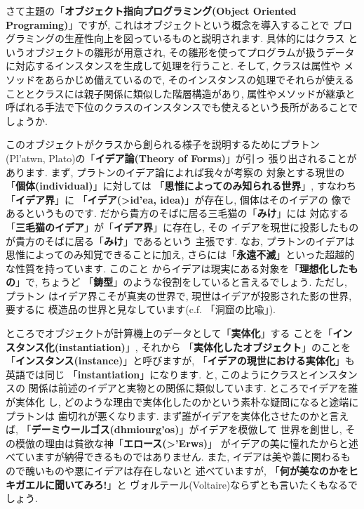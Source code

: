 \documentclass[b5j,8pt,twocolumn]{ltjsarticle}
\newcommand{\textgreek}[1]{\begingroup\fontencoding{LGR}\selectfont#1\endgroup}
\newcommand{\textgreek}[1]{\begingroup\fontencoding{LGR}\selectfont#1\endgroup}
\begin{document}
さて主題の「\textbf{オブジェクト指向プログラミング(Object Oriented
 Programing)}」ですが, これはオブジェクトという概念を導入することで
プログラミングの生産性向上を図っているものと説明されます. 具体的にはクラス
というオブジェクトの雛形が用意され, その雛形を使ってプログラムが扱うデータ
に対応するインスタンスを生成して処理を行うこと. そして, クラスは属性や
メソッドをあらかじめ備えているので, そのインスタンスの処理でそれらが使える
こととクラスには親子関係に類似した階層構造があり, 属性やメソッドが継承と
呼ばれる手法で下位のクラスのインスタンスでも使えるという長所があることで
しょうか.
\newline


このオブジェクトがクラスから創られる様子を説明するためにプラトン
(\textgreek{Pl'atwn}, Plato)の「\textbf{イデア論(Theory of Forms)}」が引っ
張り出されることがあります. まず, プラトンのイデア論によれば我々が考察の
対象とする現世の「\textbf{個体(individual)}」に対しては
「\textbf{思惟によってのみ知られる世界}」, すなわち「\textbf{イデア界}」に
「\textbf{イデア(\textgreek{>id'ea}, idea)}」が存在し, 個体はそのイデアの
像であるというものです. だから貴方のそばに居る三毛猫の「\textbf{みけ}」には
対応する「\textbf{三毛猫のイデア}」が「\textbf{イデア界}」に存在し, その
イデアを現世に投影したものが貴方のそばに居る「\textbf{みけ}」であるという
主張です. なお, プラトンのイデアは思惟によってのみ知覚できることに加え,
 さらには「\textbf{永遠不滅}」といった超越的な性質を持っています. このこと
からイデアは現実にある対象を「\textbf{理想化したもの}」で, ちょうど
「\textbf{鋳型}」のような役割をしていると言えるでしょう. ただし, プラトン
はイデア界こそが真実の世界で, 現世はイデアが投影された影の世界, 要するに
模造品の世界と見なしています(c.f. 「洞窟の比喩」\cite{国家}).
\newline


ところでオブジェクトが計算機上のデータとして「\textbf{実体化}」する
ことを「\textbf{インスタンス化(instantiation)}」, それから
「\textbf{実体化したオブジェクト}」のことを
「\textbf{インスタンス(instance)}」と呼びますが, 
「\textbf{イデアの現世における実体化}」も英語では同じ
「\textbf{instantiation}」になります. と, このようにクラスとインスタンスの
関係は前述のイデアと実物との関係に類似しています. ところでイデアを誰が実体化
し, どのような理由で実体化したのかという素朴な疑問になると途端にプラトンは
歯切れが悪くなります. まず誰がイデアを実体化させたのかと言えば,
 「\textbf{デーミウールゴス(\textgreek{dhmiourg'os})}」がイデアを模倣して
世界を創世し, その模倣の理由は貧欲な神「\textbf{エロース(\textgreek{>'Erws})}」
がイデアの美に憧れたからと述べていますが納得できるものではありません.
 また, イデアは美や善に関わるもので醜いものや悪にイデアは存在しないと
述べていますが, 「\textbf{何が美なのかをヒキガエルに聞いてみろ!}」と
ヴォルテール(Voltaire)ならずとも言いたくもなるでしょう.
\newline
\end{document}
